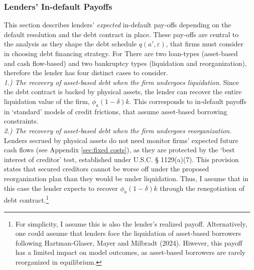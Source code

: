 \documentclass[12pt]{article}
\begin{document}
\subsubsection{Lenders' In-default Payoffs}   \label{sec:Default Payoffs}
This section describes lenders' \textit{expected} in-default pay-offs depending on the default resolution and the debt contract in place. These pay-offs are central to the analysis as they shape the debt schedule $q(a', \varepsilon)$, that firms must consider in choosing debt financing strategy. For There are two loan-types (asset-based and cash flow-based) and two bankruptcy types (liquidation and reorganization), therefore the lender has four distinct cases to consider. \vspace{3mm} \\
\textit{ 1.) The recovery of asset-based debt when the firm undergoes liquidation}. Since the debt contract is backed by physical assets, the lender can recover the entire liquidation value of the firm, $\phi_a(1-\delta)k$. This corresponds to in-default payoffs in `standard' models of credit frictions, that assume asset-based borrowing constraints. \vspace{3mm} \\
\textit{ 2.) The recovery of asset-based debt when the firm undergoes reorganization}. Lenders secrued by physical assets do not need monitor firms' expected future cash flows (see Appendix \ref{sec:fixed costs}), as they are protected by the ‘best interest of creditor’ test, established under U.S.C. § 1129(a)(7). This provision states that secured creditors cannot be worse off under the proposed reorganization plan than they would be under liquidation. Thus, I assume that in this case the lender expects to recover $\phi_a(1-\delta)k$ through the renegotiation of debt contract.\footnote{For simplicity, I assume this is also the lender’s realized payoff.  Alternatively, one could assume that lenders foce the liquidation of asset-based borrowers following Hartman-Glaser, Mayer and Milbradt (2024). Hiwever, this payoff has a limited impact on model outcomes, as asset-based borrowers are rarely reorganized in equilibrium.} \vspace{3mm} \\
\end{document}
